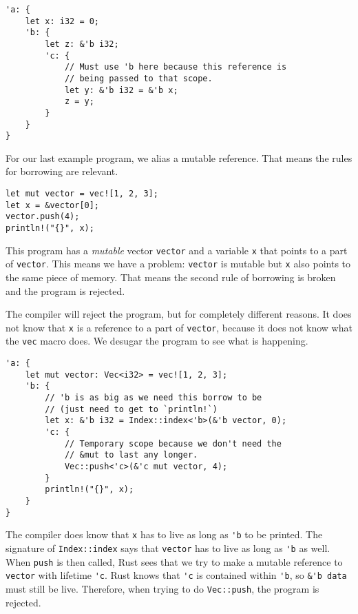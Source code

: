 \begin{verbatim}
'a: {
    let x: i32 = 0;
    'b: {
        let z: &'b i32;
        'c: {
            // Must use 'b here because this reference is
            // being passed to that scope.
            let y: &'b i32 = &'b x;
            z = y;
        }
    }
}
\end{verbatim}

For our last example program, we alias a mutable reference. That means the rules for borrowing are relevant.

\begin{verbatim}
let mut vector = vec![1, 2, 3];
let x = &vector[0];
vector.push(4);
println!("{}", x);
\end{verbatim}

This program has a \textit{mutable} vector \texttt{vector} and a variable \texttt{x} that points to a part of \texttt{vector}. This means we have a problem:  \texttt{vector} is mutable but \texttt{x} also points to the same piece of memory. That means the second rule of borrowing is broken and the program is rejected. 

The compiler will reject the program, but for completely different reasons. It does not know that \texttt{x} is a reference to a part of \texttt{vector}, because it does not know what the \texttt{vec} macro does. We desugar the program to see what is happening.

\begin{verbatim}
'a: {
    let mut vector: Vec<i32> = vec![1, 2, 3];
    'b: {
        // 'b is as big as we need this borrow to be
        // (just need to get to `println!`)
        let x: &'b i32 = Index::index<'b>(&'b vector, 0);
        'c: {
            // Temporary scope because we don't need the
            // &mut to last any longer.
            Vec::push<'c>(&'c mut vector, 4);
        }
        println!("{}", x);
    }
}
\end{verbatim}

The compiler does know that \verb|x| has to live as long as \verb|'b| to be printed. The signature of \verb|Index::index| says that \verb|vector| has to live as long as \verb|'b| as well. When \verb|push| is then called, Rust sees that we try to make a mutable reference to \verb|vector| with lifetime \verb|'c|. Rust knows that \verb|'c| is contained within \verb|'b|, so \verb|&'b data| must still be live. Therefore, when trying to do \verb|Vec::push|, the program is rejected. 
